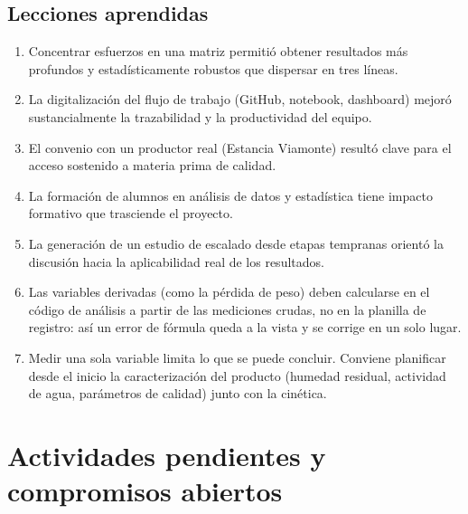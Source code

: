 \documentclass[12pt, a4paper]{article}
\begin{document}
\subsection{Lecciones aprendidas}

\begin{enumerate}[nosep]
    \item Concentrar esfuerzos en una matriz permitió obtener resultados más profundos y estadísticamente robustos que dispersar en tres líneas.
    \item La digitalización del flujo de trabajo (GitHub, notebook, dashboard) mejoró sustancialmente la trazabilidad y la productividad del equipo.
    \item El convenio con un productor real (Estancia Viamonte) resultó clave para el acceso sostenido a materia prima de calidad.
    \item La formación de alumnos en análisis de datos y estadística tiene impacto formativo que trasciende el proyecto.
    \item La generación de un estudio de escalado desde etapas tempranas orientó la discusión hacia la aplicabilidad real de los resultados.
    \item Las variables derivadas (como la pérdida de peso) deben calcularse en el código de análisis a partir de las mediciones crudas, no en la planilla de registro: así un error de fórmula queda a la vista y se corrige en un solo lugar.
    \item Medir una sola variable limita lo que se puede concluir. Conviene planificar desde el inicio la caracterización del producto (humedad residual, actividad de agua, parámetros de calidad) junto con la cinética.
\end{enumerate}

\section{Actividades pendientes y compromisos abiertos}
\label{sec:pendientes}
\end{document}
